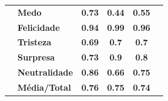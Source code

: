 \begin{table}[]
\begin{tabular}{llcccc}
                                       & \textbf{Medo}         & \textbf{0.73}                         & \textbf{0.44}                          & \textbf{0.55}                         &                                       \\
                                       & \textbf{Felicidade}   & \textbf{0.94}                         & \textbf{0.99}                          & \textbf{0.96}                         &                                       \\
                                       & \textbf{Tristeza}     & \textbf{0.69}                         & \textbf{0.7}                           & \textbf{0.7}                          &                                       \\
                                       & \textbf{Surpresa}     & \textbf{0.73}                         & \textbf{0.9}                           & \textbf{0.8}                          &                                       \\
                                       & \textbf{Neutralidade} & \textbf{0.86}                         & \textbf{0.66}                          & \textbf{0.75}                         &                                       \\
                                       & \textbf{Média/Total}  & \textbf{0.76}                         & \textbf{0.75}                          & \textbf{0.74}                         &                                       \\ \hline
\end{tabular}
\end{table}


